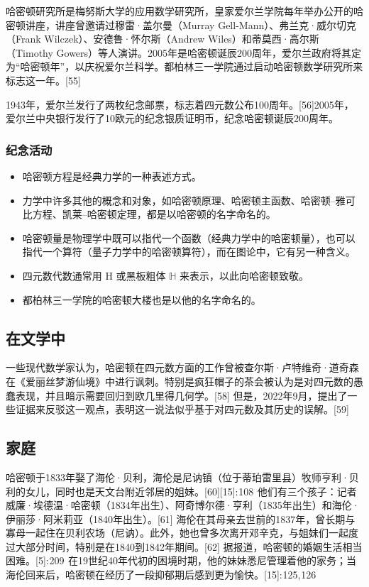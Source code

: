 哈密顿研究所是梅努斯大学的应用数学研究所，皇家爱尔兰学院每年举办公开的哈密顿讲座，讲座曾邀请过穆雷·盖尔曼（Murray Gell-Mann）、弗兰克·威尔切克（Frank Wilczek）、安德鲁·怀尔斯（Andrew Wiles）和蒂莫西·高尔斯（Timothy Gowers）等人演讲。2005年是哈密顿诞辰200周年，爱尔兰政府将其定为“哈密顿年”，以庆祝爱尔兰科学。都柏林三一学院通过启动哈密顿数学研究所来标志这一年。[55]

1943年，爱尔兰发行了两枚纪念邮票，标志着四元数公布100周年。[56]2005年，爱尔兰中央银行发行了10欧元的纪念银质证明币，纪念哈密顿诞辰200周年。
\subsubsection{纪念活动}
\begin{itemize}
\item 哈密顿方程是经典力学的一种表述方式。  
\item 力学中许多其他的概念和对象，如哈密顿原理、哈密顿主函数、哈密顿–雅可比方程、凯莱–哈密顿定理，都是以哈密顿的名字命名的。  
\item 哈密顿量是物理学中既可以指代一个函数（经典力学中的哈密顿量），也可以指代一个算符（量子力学中的哈密顿算符），而在图论中，它有另一种含义。  
\item 四元数代数通常用 H 或黑板粗体 \(\mathbb{H}\) 来表示，以此向哈密顿致敬。  
\item 都柏林三一学院的哈密顿大楼也是以他的名字命名的。
\end{itemize}
\subsection{在文学中} 
一些现代数学家认为，哈密顿在四元数方面的工作曾被查尔斯·卢特维奇·道奇森在《爱丽丝梦游仙境》中进行讽刺。特别是疯狂帽子的茶会被认为是对四元数的愚蠢表现，并且暗示需要回归到欧几里得几何学。[58] 但是，2022年9月，提出了一些证据来反驳这一观点，表明这一说法似乎基于对四元数及其历史的误解。[59]
\subsection{家庭} 
哈密顿于1833年娶了海伦·贝利，海伦是尼讷镇（位于蒂珀雷里县）牧师亨利·贝利的女儿，同时也是天文台附近邻居的姐妹。[60][15]: 108  他们有三个孩子：记者威廉·埃德温·哈密顿（1834年出生）、阿奇博尔德·亨利（1835年出生）和海伦·伊丽莎·阿米莉亚（1840年出生）。[61] 海伦在其母亲去世前的1837年，曾长期与寡母一起住在贝利农场（尼讷）。此外，她也曾多次离开邓辛克，与姐妹们一起度过大部分时间，特别是在1840到1842年期间。[62] 据报道，哈密顿的婚姻生活相当困难。[5]: 209  在19世纪40年代初的困境时期，他的妹妹悉尼管理着他的家务；当海伦回来后，哈密顿在经历了一段抑郁期后感到更为愉快。[15]: 125, 126
